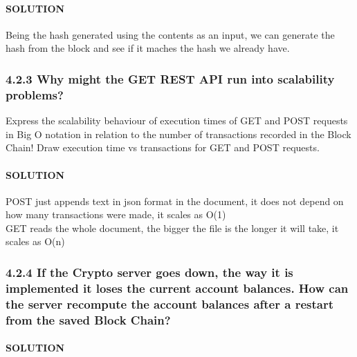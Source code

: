 \documentclass[11pt]{article}
\begin{document}
    \hypertarget{solution}{%
\paragraph{SOLUTION}\label{solution}}

Being the hash generated using the contents as an input, we can generate
the hash from the block and see if it maches the hash we already have.

    \hypertarget{why-might-the-get-rest-api-run-into-scalability-problems}{%
\subsubsection{4.2.3 Why might the GET REST API run into scalability
problems?}\label{why-might-the-get-rest-api-run-into-scalability-problems}}

Express the scalability behaviour of execution times of GET and POST
requests in Big O notation in relation to the number of transactions
recorded in the Block Chain! Draw execution time vs transactions for GET
and POST requests.

    \hypertarget{solution}{%
\paragraph{SOLUTION}\label{solution}}

POST just appends text in json format in the document, it does not
depend on how many transactions were made, it scales as O(1)\\
GET reads the whole document, the bigger the file is the longer it will
take, it scales as O(n)

    \hypertarget{if-the-crypto-server-goes-down-the-way-it-is-implemented-it-loses-the-current-account-balances.-how-can-the-server-recompute-the-account-balances-after-a-restart-from-the-saved-block-chain}{%
\subsubsection{4.2.4 If the Crypto server goes down, the way it is
implemented it loses the current account balances. How can the server
recompute the account balances after a restart from the saved Block
Chain?}\label{if-the-crypto-server-goes-down-the-way-it-is-implemented-it-loses-the-current-account-balances.-how-can-the-server-recompute-the-account-balances-after-a-restart-from-the-saved-block-chain}}

    \hypertarget{solution}{%
\paragraph{SOLUTION}\label{solution}}
\end{document}
